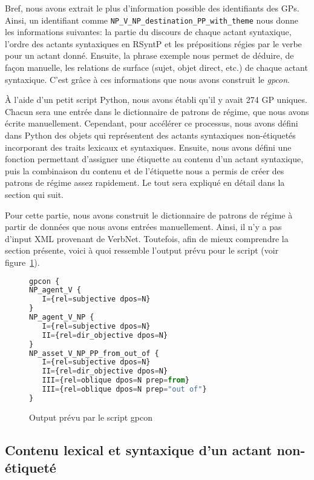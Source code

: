 Bref, nous avons extrait le plus d'information possible des identifiants des \acp{GP}. Ainsi, un identifiant comme \texttt{NP\_V\_NP\_destination\_PP\_with\_theme} nous donne les informations suivantes: la partie du discours de chaque actant syntaxique, l'ordre des actants syntaxiques en \ac{RSyntP} et les prépositions régies par le verbe pour un actant donné. Ensuite, la phrase exemple  nous permet de déduire, de façon manuelle, les relations de surface (sujet, objet direct, etc.) de chaque actant syntaxique. C'est grâce à ces informations que nous avons construit le \emph{gpcon}.

À l'aide d'un petit script Python, nous avons établi qu'il y avait 274 \ac{GP} uniques. Chacun sera une entrée dans le dictionnaire de patrons de régime, que nous avons écrite manuellement. Cependant, pour accélérer ce processus, nous avons défini dans Python des objets qui représentent des actants syntaxiques non-étiquetés incorporant des traits lexicaux et syntaxiques. Ensuite, nous avons défini une fonction permettant d'assigner une étiquette au contenu d'un actant syntaxique, puis la combinaison du contenu et de l'étiquette nous a permis de créer des patrons de régime assez rapidement. Le tout sera expliqué en détail dans la section qui suit.

Pour cette partie, nous avons construit le dictionnaire de patrons de régime à partir de données que nous avons entrées manuellement. Ainsi, il n'y a pas d'input XML provenant de VerbNet. Toutefois, afin de mieux comprendre la section présente, voici à quoi ressemble l'output prévu pour le script (voir figure~\ref{fig:outputgpcon}).

\begin{figure}[htb]
\begin{lstlisting}[language=Python]
gpcon {
NP_agent_V {
   I={rel=subjective dpos=N}
}
NP_agent_V_NP {
   I={rel=subjective dpos=N}
   II={rel=dir_objective dpos=N}
}
NP_asset_V_NP_PP_from_out_of {
   I={rel=subjective dpos=N}
   II={rel=dir_objective dpos=N}
   III={rel=oblique dpos=N prep=from}
   III={rel=oblique dpos=N prep="out of"}
}
\end{lstlisting}
  \caption{Output prévu par le script gpcon}
	\label{fig:outputgpcon}
\end{figure}
\subsection{Contenu lexical et syntaxique d'un actant non-étiqueté}

